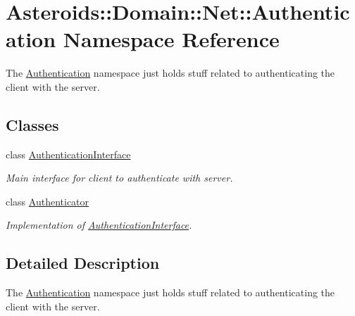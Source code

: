 \hypertarget{namespaceAsteroids_1_1Domain_1_1Net_1_1Authentication}{}\section{Asteroids\+:\+:Domain\+:\+:Net\+:\+:Authentication Namespace Reference}
\label{namespaceAsteroids_1_1Domain_1_1Net_1_1Authentication}


The \hyperlink{namespaceAsteroids_1_1Domain_1_1Net_1_1Authentication}{Authentication} namespace just holds stuff related to authenticating the client with the server.  


\subsection*{Classes}
\begin{DoxyCompactItemize}
\item 
class \hyperlink{classAsteroids_1_1Domain_1_1Net_1_1Authentication_1_1AuthenticationInterface}{Authentication\+Interface}
\begin{DoxyCompactList}\small\item\em Main interface for client to authenticate with server. \end{DoxyCompactList}\item 
class \hyperlink{classAsteroids_1_1Domain_1_1Net_1_1Authentication_1_1Authenticator}{Authenticator}
\begin{DoxyCompactList}\small\item\em Implementation of \hyperlink{classAsteroids_1_1Domain_1_1Net_1_1Authentication_1_1AuthenticationInterface}{Authentication\+Interface}. \end{DoxyCompactList}\end{DoxyCompactItemize}


\subsection{Detailed Description}
The \hyperlink{namespaceAsteroids_1_1Domain_1_1Net_1_1Authentication}{Authentication} namespace just holds stuff related to authenticating the client with the server. 